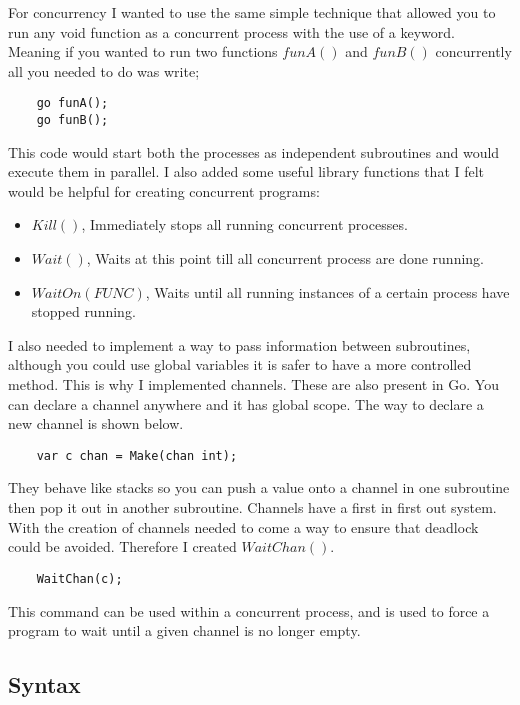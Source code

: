 For concurrency I wanted to use the same simple technique that allowed you to run any void function as a concurrent process with the use of a keyword. Meaning if you wanted to run two functions $funA()$ and $funB()$ concurrently all you needed to do was write;

\begin{lstlisting}
	go funA();
	go funB();	
\end{lstlisting}

This code would start both the processes as independent subroutines and would execute them in parallel. I also added some useful library functions that I felt would be helpful for creating concurrent programs:

\begin{itemize}
\item $Kill()$, Immediately stops all running concurrent processes.
\item $Wait()$, Waits at this point till all concurrent process are done running.
\item $WaitOn(FUNC)$, Waits until all running instances of a certain process have stopped running.
\end{itemize} 

I also needed to implement a way to pass information between subroutines, although you could use global variables it is safer to have a more controlled method. This is why I implemented channels. These are also present in Go. You can declare a channel anywhere and it has global scope. The way to declare a new channel is shown below.

\begin{lstlisting}
	var c chan = Make(chan int);	
\end{lstlisting}

They behave like stacks so you can push a value onto a channel in one subroutine then pop it out in another subroutine. Channels have a first in first out system. With the creation of channels needed to come a way to ensure that deadlock could be avoided. Therefore I created $WaitChan()$.

\begin{lstlisting}
	WaitChan(c);
\end{lstlisting}

This command can be used within a concurrent process, and is used to force a program to wait until a given channel is no longer empty. 

\subsection{Syntax}

